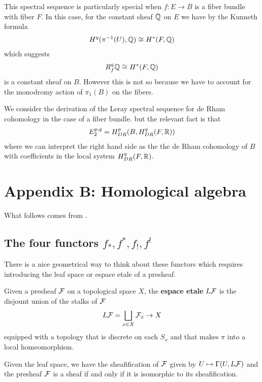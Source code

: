 \documentclass[12pt]{article}
\begin{document}
This spectral sequence is particularly special when $f:E\to B$ is a fiber bundle
with fiber $F$. In this case, for the constant sheaf $\mathbb{Q}$ on $E$ we have by
the Kunneth formula \begin{align*}
    H^q(\pi^{-1}(U),\mathbb{Q}) \cong H^*(F,\mathbb{Q})
\end{align*} which suggests \begin{align*}
    R^q_f\mathbb{Q} \cong H^*(F,\mathbb{Q})
\end{align*} is a constant sheaf on $B$. However this is not so 
because we have to account for the monodromy action of $\pi_1(B)$ on the fibers.

\hfill

\begin{example}
    We consider the derivation of the Leray spectral sequence for de Rham cohomology
    in the case of a fiber bundle.
     but the relevant fact is that \begin{align*}
        E_2^{p,q} = H^p_{DR}(B,H^q_{DR}(F,\mathbb{R}))
    \end{align*} where we can interpret the right hand side as 
    the the de Rham cohomology of $B$ with coefficients in the 
    local system $H^q_{DR}(F,\mathbb{R})$.
\end{example}

\section{Appendix B: Homological algebra}
What follows comes from \cite{goresky}.
\subsection{The four functors $f_*,f^*,f_!,f^!$}
There is a nice geometrical way to think about these functors which requires
introducing the leaf space or espace etale of a presheaf.

\begin{definition}
    Given a presheaf ${\mathcal{F}}$ on a topological space $X$, the \textbf{espace etale} $L{\mathcal{F}}$
    is the disjount union of the stalks of ${\mathcal{F}}$ \begin{align*}
        L{\mathcal{F}} = \bigsqcup_{x\in X} {\mathcal{F}}_x \to X
    \end{align*} equipped with a topology that is discrete on each $S_x$ and that makes $\pi$ into 
    a local homeomorphism.
\end{definition}

Given the leaf space, we have the sheafification of ${\mathcal{F}}$ given by $U \mapsto \Gamma(U,L{\mathcal{F}})$
and the presheaf ${\mathcal{F}}$ is a sheaf if and only if it is isomorphic to its sheafification.
\end{document}
